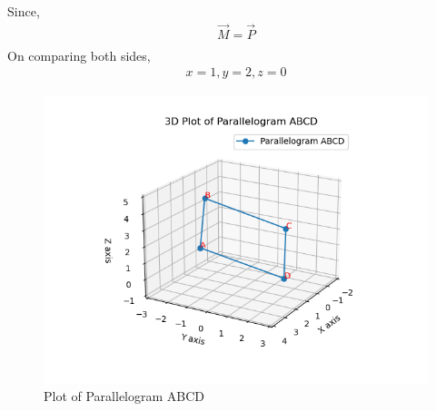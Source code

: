 \documentclass[journal]{IEEEtran}
\begin{document}
Since,
\begin{align}
\vec{M} = \vec{P} \\
\end{align}
On comparing both sides, 
\begin{align}
x=1, y=2, z=0
\end{align}
\begin{figure}[h!]
   \centering
   \includegraphics[width=0.7\linewidth]{figs/Figure_1.png}
   \caption{Plot of Parallelogram ABCD}
   \label{stemplot}
\end{figure}
\end{document}
